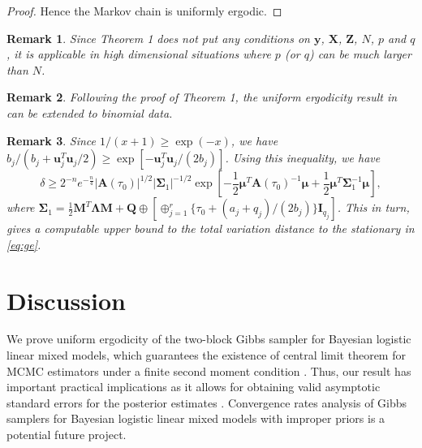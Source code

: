 \documentclass[11pt,a4paper]{article}
\newtheorem{remark}{Remark}
\begin{document}
\begin{proof}
Hence the Markov chain is uniformly ergodic.

\end{proof}



\begin{remark}
	\label{rem:condition}
Since Theorem 1 does not put any conditions on $\bm{y}$, $\bm{X}$, $\bm{Z}$, $N$, $p$ and $q$, it is applicable in high dimensional situations where $p$ (or $q$) can be much larger than $N$.
\end{remark}

\begin{remark}
Following the proof of Theorem 1, the uniform ergodicity result in \cite{choi2013polya} can be extended to binomial data.
\end{remark}

\begin{remark}
Since $1/(x+1)\geq\exp\left(-x\right)$, we have  $b_j/(b_{j}+\bm{u}_{j}^{T}\bm{u}_{j}/2) \geq \exp\left[-\bm{u}_{j}^{T}\bm{u}_{j}/(2b_{j})\right]$. Using this inequality, we have 
\[\delta\geq2^{-n}e^{-\frac{n}{4}}\left|\bm{A}\left(\tau_{0}\right)\right|^{1/2}\left|\bm{\Sigma}_{1}\right|^{-1/2}\exp\left[-\frac{1}{2}\bm{\mu}^{T}\bm{A}\left(\tau_{0}\right)^{-1}\bm{\mu}+\frac{1}{2}\bm{\mu}^{T}\bm{\Sigma}_{1}^{-1}\bm{\mu}\right],
\]
where $\bm{\Sigma}_{1}=\frac{1}{2}\bm{M}^{T}\bm{\Lambda}\bm{M}+ \bm{Q}\oplus \left [\oplus_{j=1}^{r}\{\tau_{0} + (a_{j}+q_{j})/(2b_{j})\}\bm{I}_{q_{j}} \right] $. This in turn, gives a computable upper bound to the total variation distance to the stationary in \eqref{eq:ge}.
\end{remark}


\section{Discussion}
\label{sec_dis}
 We prove uniform ergodicity of the two-block Gibbs sampler for Bayesian logistic linear mixed models, which guarantees the existence of central limit theorem for MCMC estimators under a finite second moment condition \citep{jones2004markov}. Thus, our result has important practical implications as it allows for obtaining valid asymptotic standard errors for the posterior estimates \citep{flegal2010batch}. %
 Convergence rates analysis of Gibbs samplers for Bayesian logistic linear mixed models with improper priors is a potential  future project.

 

\end{document}
